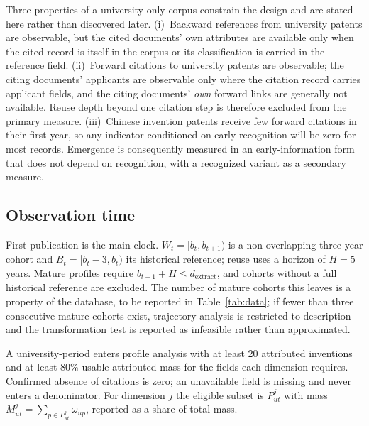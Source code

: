Three properties of a university-only corpus constrain the design and are
stated here rather than discovered later. (i)~Backward references from
university patents are observable, but the cited documents' own attributes
are available only when the cited record is itself in the corpus or its
classification is carried in the reference field. (ii)~Forward citations to
university patents are observable; the citing documents' applicants are
observable only where the citation record carries applicant fields, and the
citing documents' \emph{own} forward links are generally not available. Reuse
depth beyond one citation step is therefore excluded from the primary measure.
(iii)~Chinese invention patents receive few forward citations in their first
year, so any indicator conditioned on early recognition will be zero for most
records. Emergence is consequently measured in an early-information form that
does not depend on recognition, with a recognized variant as a secondary
measure.

\subsection{Observation time}
First publication is the main clock. $W_t=[b_t,b_{t+1})$ is a non-overlapping
three-year cohort and $B_t=[b_t-3,b_t)$ its historical reference; reuse uses a
horizon of $H=5$ years. Mature profiles require $b_{t+1}+H\leq d_{\mathrm{extract}}$,
and cohorts without a full historical reference are excluded. The number of
mature cohorts this leaves is a property of the database, to be reported in
Table~\ref{tab:data}; if fewer than three consecutive mature cohorts exist,
trajectory analysis is restricted to description and the transformation test
is reported as infeasible rather than approximated.

A university-period enters profile analysis with at least 20 attributed
inventions and at least 80\% usable attributed mass for the fields each
dimension requires. Confirmed absence of citations is zero; an unavailable
field is missing and never enters a denominator. For dimension $j$ the eligible
subset is $P^j_{ut}$ with mass $M^j_{ut}=\sum_{p\in P^j_{ut}}\omega_{up}$,
reported as a share of total mass.

